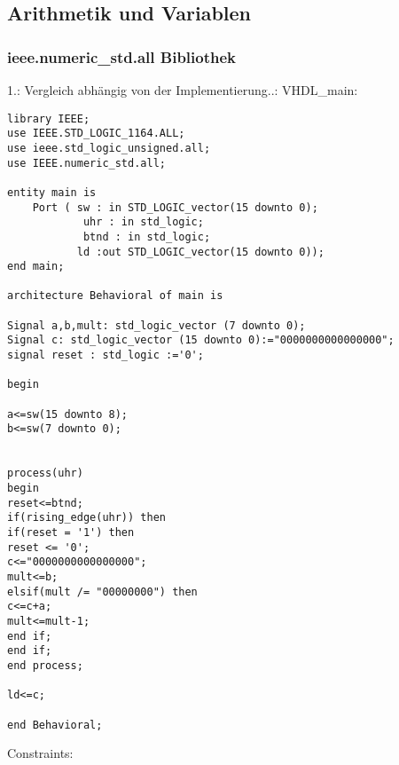 \documentclass{article}
\begin{document}
\subsection{Arithmetik und Variablen}
\subsubsection{ieee.numeric\_std.all Bibliothek}
1.:\newline
Vergleich abh\"angig von der Implementierung..:\newline
VHDL\_main:\newline
\begin{verbatim}
library IEEE;
use IEEE.STD_LOGIC_1164.ALL;
use ieee.std_logic_unsigned.all;
use IEEE.numeric_std.all;

entity main is
    Port ( sw : in STD_LOGIC_vector(15 downto 0);
            uhr : in std_logic;
            btnd : in std_logic;
           ld :out STD_LOGIC_vector(15 downto 0));
end main;

architecture Behavioral of main is

Signal a,b,mult: std_logic_vector (7 downto 0);
Signal c: std_logic_vector (15 downto 0):="0000000000000000";
signal reset : std_logic :='0';

begin

a<=sw(15 downto 8);
b<=sw(7 downto 0);


process(uhr)
begin
reset<=btnd;
if(rising_edge(uhr)) then
if(reset = '1') then
reset <= '0';
c<="0000000000000000";
mult<=b;
elsif(mult /= "00000000") then
c<=c+a;
mult<=mult-1;
end if;
end if;
end process;

ld<=c;

end Behavioral;
\end{verbatim}
Constraints:\newline
\end{document}
